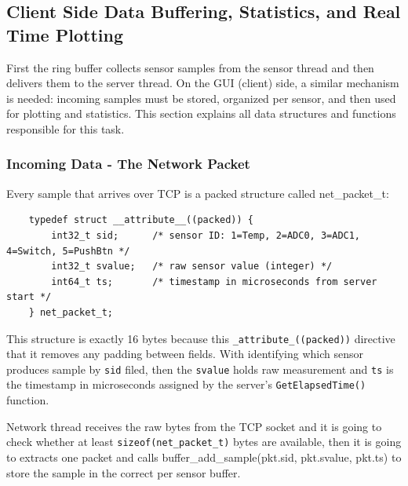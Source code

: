 

\subsection{Client Side Data Buffering, Statistics, and Real Time Plotting}
First the ring buffer collects sensor samples from the sensor thread and then delivers them to the server thread. On the GUI (client) side, a similar mechanism is needed: incoming samples must be stored, organized per sensor, and then used for plotting and statistics. This section explains all data structures and functions responsible for this task.

\subsubsection{Incoming Data - The Network Packet}
Every sample that arrives over TCP is a packed structure called net\_packet\_t:
    \begin{verbatim}
    typedef struct __attribute__((packed)) {
        int32_t sid;      /* sensor ID: 1=Temp, 2=ADC0, 3=ADC1, 4=Switch, 5=PushBtn */
        int32_t svalue;   /* raw sensor value (integer) */
        int64_t ts;       /* timestamp in microseconds from server start */
    } net_packet_t;
\end{verbatim}

This structure is exactly 16 bytes because this \texttt{\_attribute\_((packed))} directive that it removes any padding between fields. With identifying which sensor produces sample by \texttt{sid} filed, then the \texttt{svalue} holds raw measurement and \texttt{ts} is the timestamp in microseconds assigned by the server's \texttt{GetElapsedTime()} function.

Network thread receives the raw bytes from the TCP socket and it is going to check whether at least \texttt{sizeof(net\_packet\_t)} bytes are available, then it is going to extracts one packet and calls buffer\_add\_sample(pkt.sid, pkt.svalue, pkt.ts) to store the sample in the correct per sensor buffer.

